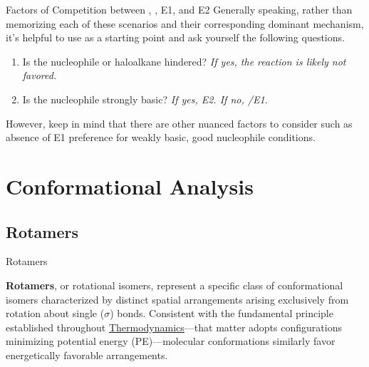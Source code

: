 \documentclass[10pt]{article}
\begin{document}
\begin{core}{Factors of Competition between \snt, \sno, E1, and E2}
      Generally speaking, rather than memorizing each of these scenarios and their corresponding dominant mechanism, it's helpful to use \snt as a starting point and ask yourself the following questions.

      \begin{enumerate}

        \item Is the nucleophile or haloalkane hindered? \textit{If yes, the \snt reaction is likely not favored.}

        \item Is the nucleophile strongly basic? \textit{If yes, E2. If no, \sno/E1.}
          
      \end{enumerate}

      However, keep in mind that there are other nuanced factors to consider such as absence of E1 preference for weakly basic, good nucleophile conditions.

    \end{core}

\section{Conformational Analysis}

  \subsection{Rotamers}

    \begin{core}{Rotamers}
   
      \textbf{Rotamers}, or rotational isomers, represent a specific class of conformational isomers characterized by distinct spatial arrangements arising exclusively from rotation about single ($\sigma$) bonds. Consistent with the fundamental principle established throughout \href{../thermodynamics/thermodynamics.pdf}{Thermodynamics}---that matter adopts configurations minimizing potential energy (PE)---molecular conformations similarly favor energetically favorable arrangements.

    \end{core}
\end{document}
